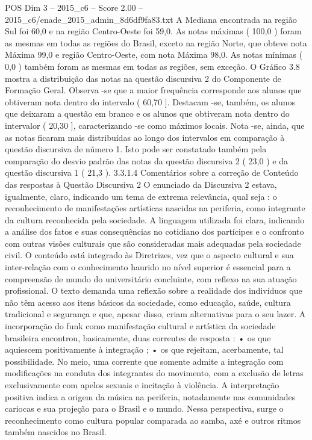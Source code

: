\begin{textsample}{POS Dim 3 – 2015\_c6 – Score 2.00 – 2015\_c6/enade\_2015\_admin\_8d6df9fa83.txt}
A Mediana encontrada na região Sul foi 60,0 e na região Centro-Oeste foi 59,0.
As notas máximas ( 100,0 ) foram as mesmas em todas as regiões do Brasil, exceto na região Norte, que obteve nota Máxima 99,0 e região Centro-Oeste, com nota Máxima 98,0.
As notas mínimas ( 0,0 ) também foram as mesmas em todas as regiões, sem exceção.
O Gráfico 3.8 mostra a distribuição das notas na questão discursiva 2 do Componente de Formação Geral.
Observa -se que a maior frequência corresponde aos alunos que obtiveram nota dentro do intervalo ( 60,70 ].
Destacam -se, também, os alunos que deixaram a questão em branco e os alunos que obtiveram nota dentro do intervalor ( 20,30 ], caracterizando -se como máximos locais.
Nota -se, ainda, que as notas ficaram mais distribuídas ao longo dos intervalos em comparação à questão discursiva de número 1.
Isto pode ser constatado também pela comparação do desvio padrão das notas da questão discursiva 2 ( 23,0 ) e da questão discursiva 1 ( 21,3 ). 3.3.1.4 Comentários sobre a correção de Conteúdo das respostas à Questão Discursiva 2 O enunciado da Discursiva 2 estava, igualmente, claro, indicando um tema de extrema relevância, qual seja : o reconhecimento de manifestações artísticas nascidas na periferia, como integrante da cultura reconhecida pela sociedade.
A linguagem utilizada foi clara, indicando a análise dos fatos e suas consequências no cotidiano dos partícipes e o confronto com outras visões culturais que são consideradas mais adequadas pela sociedade civil.
O conteúdo está integrado às Diretrizes, vez que o aspecto cultural e sua inter-relação com o conhecimento haurido no nível superior é essencial para a compreensão de mundo do universitário concluinte, com reflexo na sua atuação profissional.
O texto demanda uma reflexão sobre a realidade dos indivíduos que não têm acesso aos itens básicos da sociedade, como educação, saúde, cultura tradicional e segurança e que, apesar disso, criam alternativas para o seu lazer.
A incorporação do funk como manifestação cultural e artística da sociedade brasileira encontrou, basicamente, duas correntes de resposta : • os que aquiescem positivamente à integração ; • os que rejeitam, acerbamente, tal possibilidade.
No meio, uma corrente que somente admite a integração com modificações na conduta dos integrantes do movimento, com a exclusão de letras exclusivamente com apelos sexuais e incitação à violência.
A interpretação positiva indica a origem da música na periferia, notadamente nas comunidades cariocas e sua projeção para o Brasil e o mundo.
Nessa perspectiva, surge o reconhecimento como cultura popular comparada ao samba, axé e outros ritmos também nascidos no Brasil.

\end{textsample}
